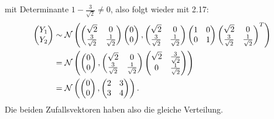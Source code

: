 \documentclass[a4paper]{article}
\begin{document}
mit Determinante $1 - \frac{3}{\sqrt{2}} \neq 0$, also folgt wieder mit 2.17:
\begin{align*}
    \left(\begin{matrix}Y_1 \\ Y_2\end{matrix}\right) &\sim \mathcal{N} \left( \left(\begin{matrix}\sqrt{2} & 0 \\ \frac{3}{\sqrt{2}} & \frac{1}{\sqrt{2}}\end{matrix}\right) \left(\begin{matrix}0 \\ 0\end{matrix}\right), \left(\begin{matrix}\sqrt{2} & 0 \\ \frac{3}{\sqrt{2}} & \frac{1}{\sqrt{2}}\end{matrix}\right) \left(\begin{matrix}1 & 0 \\ 0 & 1\end{matrix}\right) \left(\begin{matrix}\sqrt{2} & 0 \\ \frac{3}{\sqrt{2}} & \frac{1}{\sqrt{2}}\end{matrix}\right)^T \right)\\
    &= \mathcal{N} \left( \left(\begin{matrix}0 \\ 0\end{matrix}\right), \left(\begin{matrix}\sqrt{2} & 0 \\ \frac{3}{\sqrt{2}} & \frac{1}{\sqrt{2}}\end{matrix}\right) \left(\begin{matrix}\sqrt{2} & \frac{3}{\sqrt{2}} \\ 0 & \frac{1}{\sqrt{2}}\end{matrix}\right)   \right)\\
    &= \mathcal{N}\left( \left(\begin{matrix}0 \\ 0\end{matrix}\right), \left(\begin{matrix}2 &  3 \\ 3 & 4\end{matrix}\right) \right)
    \text{.}
\end{align*}
Die beiden Zufallsvektoren haben also die gleiche Verteilung.
\end{document}
